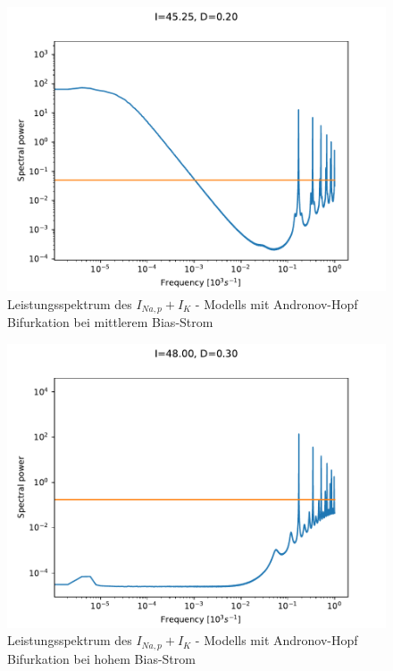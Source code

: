 \documentclass[12pt,a4paper]{article}
\begin{document}
\begin{figure}[H]
	\centering
	\includegraphics[scale=1]{spanhopfd20imediumwlim.pdf}\caption{Leistungsspektrum des $I_{Na,p}+I_K$ - Modells mit Andronov-Hopf Bifurkation bei mittlerem Bias-Strom}
	\label{spanhopfimedium}
\end{figure}
\begin{figure}[H]
	\centering
	\includegraphics[scale=1]{spanhopfd30ilargewlim.pdf}\caption{Leistungsspektrum des $I_{Na,p}+I_K$ - Modells mit Andronov-Hopf Bifurkation bei hohem Bias-Strom}
	\label{spanhopfilarge}
\end{figure}
\end{document}
